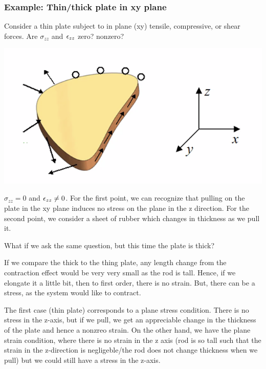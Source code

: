 \subsubsection{Example: Thin/thick plate in xy plane}
Consider a thin plate subject to in plane (xy) tensile, compressive, or shear forces. Are $\sigma_{zz}$ and $\epsilon_{zz}$ zero? nonzero?
\begin{center}
    \includegraphics[scale=0.8]{Lecture-31/l31-img4.png}
\end{center}
\begin{s}
$\sigma_{zz} = 0$ and $\epsilon_{zz} \neq 0$. For the first point, we can recognize that pulling on the plate in the xy plane induces no stress on the plane in the z direction. For the second point, we consider a sheet of rubber which changes in thickness as we pull it.
\end{s}
What if we ask the same question, but this time the plate is thick?
\begin{s}
If we compare the thick to the thing plate, any length change from the contraction effect would be very very small as the rod is tall. Hence, if we elongate it a little bit, then to first order, there is no strain. But, there can be a stress, as the system would like to contract.
\end{s}

The first case (thin plate) corresponds to a plane stress condition. There is no stress in the z-axis, but if we pull, we get an appreciable change in the thickness of the plate and hence a nonzreo strain. On the other hand, we have the plane strain condition, where there is no strain in the z axis (rod is so tall such that the strain in the z-direction is negligeble/the rod does not change thickness when we pull) but we could still have a stress in the z-axis.

